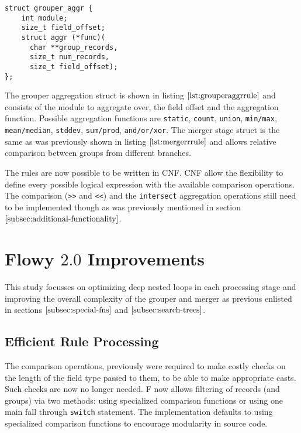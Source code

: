 \begin{lstlisting}
struct grouper_aggr {
	int module;
	size_t field_offset;
	struct aggr (*func)(
	  char **group_records,
	  size_t num_records,
	  size_t field_offset);
};
\end{lstlisting}
The grouper aggregation struct is shown in listing $\ref{lst:grouperaggrrule}$ and consists of the module to aggregate over, the field offset and the aggregation function.  Possible aggregation functions are \texttt{static}, \texttt{count}, \texttt{union}, \texttt{min/max}, \texttt{mean/median}, \texttt{stddev}, \texttt{sum/prod}, \texttt{and/or/xor}. The merger stage struct is the same as was previously shown in listing $\ref{lst:mergerrrule}$ and allows relative comparison between groups from different branches. 

The rules are now possible to be written in \ac{CNF}. \ac{CNF} allow the flexibility to define every possible logical expression with the available comparison operations.  The comparison (\texttt{>>} and \texttt{<<}) and the \texttt{intersect} aggregation operations still need to be implemented though as was previously mentioned in section $\ref{subsec:additional-functionality}$. 

\section{Flowy $2.0$ Improvements}\label{sec:flowy-2-improvements}
This study focusses on optimizing deep nested loops in each processing stage and improving the overall complexity of the grouper and merger as previous enlisted in sections $\ref{subsec:special-fns}$ and $\ref{subsec:search-trees}$.

\subsection{Efficient Rule Processing}\label{sec:rule-processing}
The comparison operations, previously were required to make costly checks on the length of the field type passed to them, to be able to make appropriate casts. Such checks are now no longer needed. F now allows filtering of records (and groups) via two methods: using specialized comparison functions or using one main fall through \texttt{switch} statement. The implementation defaults to using specialized comparison functions to encourage modularity in source code. 

